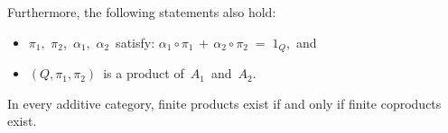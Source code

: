 \begin{proposition}
\begin{enumerate}
\begin{itemize}
	\end{itemize}
	Furthermore, the following statements also hold:
	\begin{itemize}
	\item
		$\pi_{1}$, \,$\pi_{2}$, \,$\alpha_{1}$, \,$\alpha_{2}$\, satisfy:
		\;$\alpha_{1} \circ \pi_{1} \,+\, \alpha_{2} \circ \pi_{2} \; = \; 1_{Q}$,\, and
	\item
		$(Q,\pi_{1},\pi_{2})$\, is a product of \,$A_{1}$\, and \,$A_{2}$.\,
	\end{itemize}
\end{enumerate}
\end{proposition}


\vskip 0.25cm
\begin{corollary}
\mbox{}
\vskip 0.10cm
\noindent
In every additive category, finite products exist if and only if finite coproducts exist.
\end{corollary}


